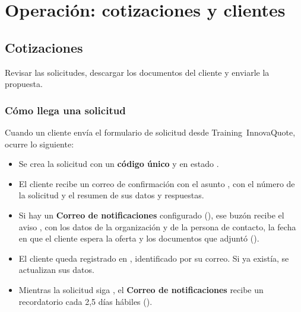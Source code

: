 \chapter{Operación: cotizaciones y clientes}\label{cap:operacion}


\section{Cotizaciones}\label{sec:cotizaciones}

  {Revisar las solicitudes, descargar los documentos del cliente y enviarle la propuesta.}

\subsection{Cómo llega una solicitud}\label{sec:ciclo}

Cuando un cliente envía el formulario de solicitud desde Training~InnovaQuote, ocurre lo siguiente:

\begin{itemize}
  \item Se crea la solicitud con un \textbf{código único} y en estado \pendiente.
  \item El cliente recibe un correo de confirmación con el asunto
        , con el número de la solicitud y
        el resumen de sus datos y respuestas.
  \item Si hay un \textbf{Correo de notificaciones} configurado (),
        ese buzón recibe el aviso , con los datos
        de la organización y de la persona de contacto, la fecha en que el cliente espera la
        oferta y los documentos que adjuntó ().
  \item El cliente queda registrado en , identificado por su correo.
        Si ya existía, se actualizan sus datos.
  \item Mientras la solicitud siga \pendiente, el \textbf{Correo de notificaciones} recibe un
        recordatorio cada 2,5 días hábiles ().
\end{itemize}

